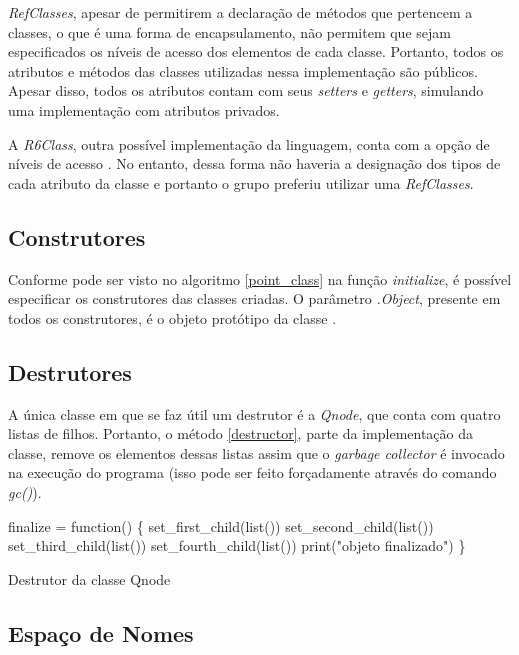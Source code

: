 \documentclass[rel_mlp]{iiufrgs}
\makeatletter
\newcommand{\nosemic}{\renewcommand{\@endalgocfline}{\relax}}%
\makeatother
\begin{document}
 \textit{RefClasses}, apesar de permitirem a declaração de métodos que pertencem a classes, o que é uma
 forma de encapsulamento, não permitem que sejam especificados os níveis de acesso dos elementos de cada
 classe. Portanto, todos os atributos e métodos das classes utilizadas nessa implementação são públicos.
 Apesar disso, todos os atributos contam com seus \textit{setters} e \textit{getters}, simulando uma
 implementação com atributos privados.

 A \textit{R6Class}, outra possível implementação da linguagem, conta com a opção de níveis de acesso \cite{R6}.
 No entanto, dessa forma não haveria a designação dos tipos de cada atributo da classe e portanto o grupo
 preferiu utilizar uma \textit{RefClasses}.

\subsection{Construtores}

    Conforme pode ser visto no algoritmo \ref{point_class} na função \textit{initialize}, é possível
    especificar os construtores das classes criadas. O parâmetro \textit{.Object}, presente em todos
    os construtores, é o objeto protótipo da classe \cite{init_meth}.

\subsection{Destrutores}

    A única classe em que se faz útil um destrutor é a \textit{Qnode}, que conta com quatro listas
    de filhos. Portanto, o método \ref{destructor}, parte da implementação da classe, remove os elementos dessas listas assim que o
    \textit{garbage collector} é invocado na execução do programa (isso pode ser feito forçadamente
    através do comando \textit{gc()}).

\begin{algorithm}
\label{destructor}
  \nosemic finalize = function() {\{} \;
 \nosemic set{\_}first{\_}child(list()) \;
  \nosemic set{\_}second{\_}child(list()) \;
  \nosemic set{\_}third{\_}child(list()) \;
 \nosemic set{\_}fourth{\_}child(list()) \;
  \nosemic print("objeto finalizado") \;
  \nosemic {\}} \;
  \caption{Destrutor da classe Qnode}
  \end{algorithm}

\subsection{Espaço de Nomes}
\end{document}
